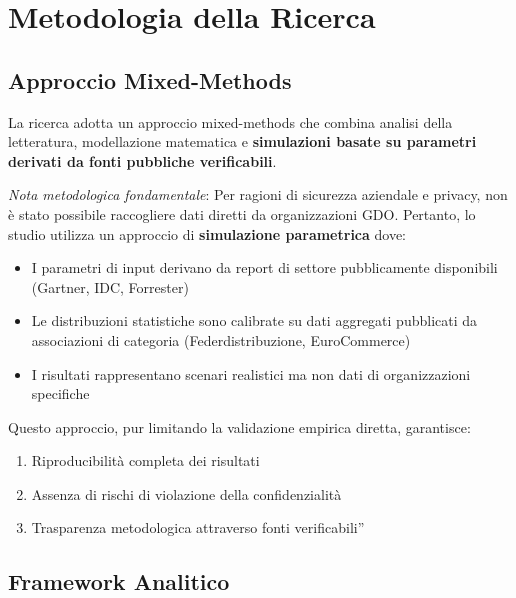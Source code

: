 \documentclass{report}
\providecommand{\tightlist}{%
  \setlength{\itemsep}{0pt}\setlength{\parskip}{0pt}
}
\begin{document}
\section{\texorpdfstring{\textbf{Metodologia della
Ricerca}}{1.5 Metodologia della Ricerca}}\label{metodologia-della-ricerca}

\subsection{\texorpdfstring{\textbf{Approccio
Mixed-Methods}}{1.5.1 Approccio Mixed-Methods}}\label{approccio-mixed-methods}

La ricerca adotta un approccio mixed-methods che combina analisi della letteratura, modellazione matematica e \textbf{simulazioni basate su parametri derivati da fonti pubbliche verificabili}.

\emph{Nota metodologica fondamentale}: Per ragioni di sicurezza
aziendale e privacy, non è stato possibile raccogliere dati diretti da organizzazioni GDO. Pertanto, lo studio utilizza un approccio di \textbf{simulazione parametrica} dove:

\begin{itemize}
\tightlist
\item
  I parametri di input derivano da report di settore pubblicamente
  disponibili (Gartner, IDC, Forrester)\\
\item
  Le distribuzioni statistiche sono calibrate su dati aggregati
  pubblicati da associazioni di categoria (Federdistribuzione,
  EuroCommerce)\\
\item
  I risultati rappresentano scenari realistici ma non dati di
  organizzazioni specifiche
\end{itemize}

Questo approccio, pur limitando la validazione empirica diretta,
garantisce:

\begin{enumerate}
\def\labelenumi{\arabic{enumi}.}
\tightlist
\item
  Riproducibilità completa dei risultati\\
\item
  Assenza di rischi di violazione della confidenzialità\\
\item
  Trasparenza metodologica attraverso fonti verificabili''
\end{enumerate}

\subsection{\texorpdfstring{\textbf{Framework
Analitico}}{1.5.2 Framework Analitico}}\label{framework-analitico}
\end{document}
